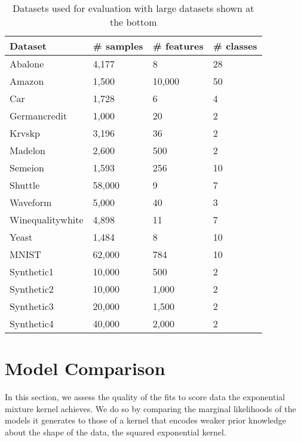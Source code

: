\documentclass[a4paper,12pt,twoside,openright]{report}
\begin{document}
\begin{table}[t]
\centering


\begin{tabular}{|l|l|l|l|}
\hline
Dataset          & \# samples & \# features & \# classes \\ \hline\hline
Abalone          & 4,177       & 8           & 28         \\ \hline
Amazon           & 1,500       & 10,000       & 50         \\ \hline
Car              & 1,728       & 6           & 4          \\ \hline
Germancredit     & 1,000       & 20          & 2          \\ \hline
Krvskp           & 3,196       & 36          & 2          \\ \hline
Madelon          & 2,600       & 500         & 2          \\ \hline
Semeion          & 1,593       & 256         & 10         \\ \hline
Shuttle          & 58,000      & 9           & 7          \\ \hline
Waveform         & 5,000       & 40          & 3          \\ \hline
Winequalitywhite & 4,898       & 11          & 7          \\ \hline
Yeast            & 1,484       & 8           & 10         \\ \hline\hline
MNIST            & 62,000      & 784         & 10         \\ \hline
Synthetic1            & 10,000       & 500           & 2         \\ \hline
Synthetic2            & 10,000       & 1,000           & 2         \\ \hline
Synthetic3            & 20,000       & 1,500           & 2         \\ \hline
Synthetic4            & 40,000       & 2,000           & 2         \\ \hline
\end{tabular}

\caption{Datasets used for evaluation with large datasets shown at the bottom}
\label{datasets_info}

\end{table}

\section{Model Comparison}
In this section, we assess the quality of the fits to score data the exponential mixture kernel achieves. We do so by comparing the marginal likelihoods of the models it generates to those of a kernel that encodes weaker prior knowledge about the shape of the data, the squared exponential kernel.
\end{document}
